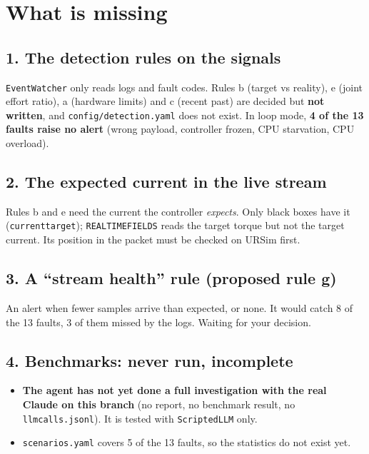 \documentclass[10pt]{article}
\newcommand{\brkus}{\textunderscore\allowbreak}
\newcommand{\f}[1]{\texttt{\let\_\brkus #1}}
\begin{document}
\section{What is missing}

\subsection{1. The detection rules on the signals}
\f{EventWatcher} only reads logs and fault codes. Rules b (target vs reality), e (joint effort
ratio), a (hardware limits) and c (recent past) are decided but \textbf{not written}, and
\f{config/detection.yaml} does not exist. In loop mode, \textbf{4 of the 13 faults raise no alert}
(wrong payload, controller frozen, CPU starvation, CPU overload).

\subsection{2. The expected current in the live stream}
Rules b and e need the current the controller \emph{expects}. Only black boxes have it
(\f{current\_target}); \f{REALTIME\_FIELDS} reads the target torque but not the target current.
Its position in the packet must be checked on URSim first.

\subsection{3. A ``stream health'' rule (proposed rule g)}
An alert when fewer samples arrive than expected, or none. It would catch 8 of the 13 faults,
3 of them missed by the logs. Waiting for your decision.

\subsection{4. Benchmarks: never run, incomplete}
\begin{itemize}
\item \textbf{The agent has not yet done a full investigation with the real Claude on this
branch} (no report, no benchmark result, no \f{llm\_calls.jsonl}). It is tested with
\f{ScriptedLLM} only.
\item \f{scenarios.yaml} covers 5 of the 13 faults, so the statistics do not exist yet.
\end{itemize}
\end{document}
